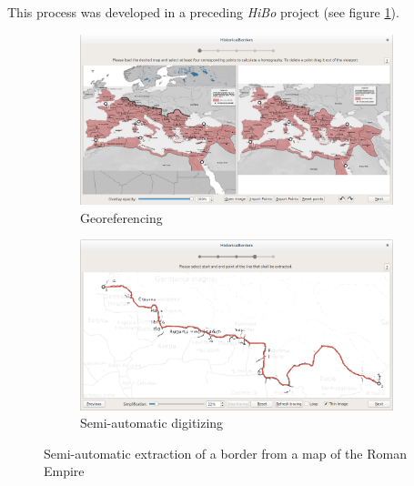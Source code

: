 This process was developed in a preceding \emph{HiBo} project
(see figure \ref{fig:hibo}).

\begin{figure}[ht]
  \centering
  \begin{subfigure}{0.48\textwidth}
    \centering
    \includegraphics[width=0.95\linewidth]{graphics/basics/hibo1.png}
    \caption{Georeferencing}
  \end{subfigure}
  \begin{subfigure}{0.48\textwidth}
    \centering
    \includegraphics[width=0.95\linewidth]{graphics/basics/hibo2.png}
    \caption{Semi-automatic digitizing}
  \end{subfigure}
  \caption{Semi-automatic extraction of a border from a map of the Roman Empire \protect\footnotemark}
  \label{fig:hibo}
\end{figure}

